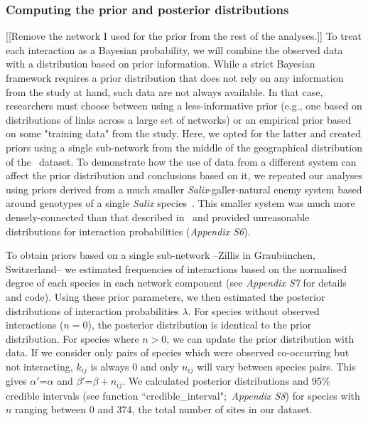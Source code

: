 \documentclass[12pt]{article}
\begin{document}
\begin{spacing}{2.0}
    \subsubsection*{Computing the prior and posterior distributions}
      [[Remove the network I used for the prior from the rest of the analyses.]]
        To treat each interaction as a Bayesian probability, we will combine the observed data with a distribution based on prior information. While a strict Bayesian framework requires a prior distribution that does not rely on any information from the study at hand, such data are not always available. In that case, researchers must choose between using a less-informative prior (e.g., one based on distributions of links across a large set of networks) or an empirical prior based on some "training data" from the study. Here, we opted for the latter and created priors using a single sub-network from the middle of the geographical distribution of the~\citet{Kopelke2017} dataset. To demonstrate how the use of data from a different system can affect the prior distribution and conclusions based on it, we repeated our analyses using priors derived from a much smaller \emph{Salix}-galler-natural enemy system based around genotypes of a single \emph{Salix} species~\citep[Data available from the Dryad Digital Repository: https://doi.org/10.5061/dryad.g7805]{Barbour2016}\nocite{Barbour2016Dryad}. This smaller system was much more densely-connected than that described in~\citet{Kopelke2017} and provided unreasonable distributions for interaction probabilities (\emph{Appendix S6}). 


        To obtain priors based on a single sub-network --Zillis in Graub\"{u}nchen, Switzerland-- we estimated frequencies of interactions based on the normalised degree of each species in each network component (see \emph{Appendix S7} for details and code). Using these prior parameters, we then estimated the posterior distributions of interaction probabilities $\lambda$. For species without observed interactions ($n = 0$), the posterior distribution is identical to the prior distribution. For species where $n>0$, we can update the prior distribution with data. If we consider only pairs of species which were observed co-occurring but not interacting, $k_{ij}$ is always 0 and only $n_{ij}$ will vary between species pairs. This gives $\alpha'$=$\alpha$ and $\beta'$=$\beta + n_{ij}$. We calculated posterior distributions and 95\% credible intervals (see function ``credible\_interval";~\emph{Appendix S8}) for species with $n$ ranging between 0 and 374, the total number of sites in our dataset. 



\end{spacing}
\end{document}
